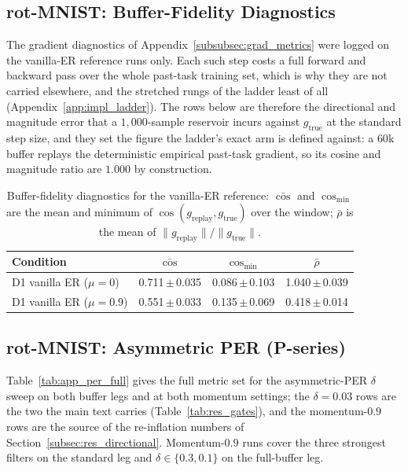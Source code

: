 \subsection{rot-MNIST: Buffer-Fidelity Diagnostics}
\label{app:grad_full}

The gradient diagnostics of Appendix~\ref{subsubsec:grad_metrics} were logged on the vanilla-ER reference runs only. Each such step costs a full forward and backward pass over the whole past-task training set, which is why they are not carried elsewhere, and the stretched rungs of the ladder least of all (Appendix~\ref{app:impl_ladder}). The rows below are therefore the directional and magnitude error that a $1{,}000$-sample reservoir incurs against $g_{\text{true}}$ at the standard step size, and they set the figure the ladder's exact arm is defined against: a $60$k buffer replays the deterministic empirical past-task gradient, so its cosine and magnitude ratio are $1.000$ by construction.

\begin{table}[H]
    \centering
    \scriptsize
    \setlength{\tabcolsep}{4pt}
    \begin{tabular}{l ccc}
        \hline
        Condition                   & $\bar{\cos}$        & $\cos_{\min}$       & $\bar{\rho}$        \\
        \hline
        D1 vanilla ER ($\mu{=}0$)   & 0.711\,$\pm$\,0.035 & 0.086\,$\pm$\,0.103 & 1.040\,$\pm$\,0.039 \\
        D1 vanilla ER ($\mu{=}0.9$) & 0.551\,$\pm$\,0.033 & 0.135\,$\pm$\,0.069 & 0.418\,$\pm$\,0.014 \\
        \hline
    \end{tabular}
    \caption{Buffer-fidelity diagnostics for the vanilla-ER reference: $\bar{\cos}$ and $\cos_{\min}$ are the mean and minimum of $\cos(g_{\text{replay}}, g_{\text{true}})$ over the window; $\bar{\rho}$ is the mean of $\|g_{\text{replay}}\|/\|g_{\text{true}}\|$.}
    \label{tab:app_grad}
\end{table}

\subsection{rot-MNIST: Asymmetric PER (P-series)}
\label{app:per_full}

Table~\ref{tab:app_per_full} gives the full metric set for the asymmetric-PER $\delta$ sweep on both buffer legs and at both momentum settings; the $\delta{=}0.03$ rows are the two the main text carries (Table~\ref{tab:res_gates}), and the momentum-$0.9$ rows are the source of the re-inflation numbers of Section~\ref{subsec:res_directional}. Momentum-$0.9$ runs cover the three strongest filters on the standard leg and $\delta \in \{0.3, 0.1\}$ on the full-buffer leg.

